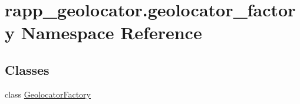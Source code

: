 \hypertarget{namespacerapp__geolocator_1_1geolocator__factory}{\section{rapp\-\_\-geolocator.\-geolocator\-\_\-factory Namespace Reference}
\label{namespacerapp__geolocator_1_1geolocator__factory}
}
\subsection*{Classes}
\begin{DoxyCompactItemize}
\item 
class \hyperlink{classrapp__geolocator_1_1geolocator__factory_1_1GeolocatorFactory}{Geolocator\-Factory}
\end{DoxyCompactItemize}
